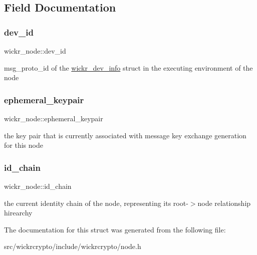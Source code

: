 \subsection{Field Documentation}
\mbox{\label{structwickr__node_a564e42fc1d4b63353d74e5fbf0bead82}} 
\subsubsection{\texorpdfstring{dev\+\_\+id}{dev\_id}}
{\footnotesize\ttfamily wickr\+\_\+node\+::dev\+\_\+id}

msg\+\_\+proto\+\_\+id of the \textquotesingle{}\mbox{\hyperlink{structwickr__dev__info}{wickr\+\_\+dev\+\_\+info}}\textquotesingle{} struct in the executing environment of the node \mbox{\label{structwickr__node_a628b61eed5cb17b831ff687143393b93}} 
\subsubsection{\texorpdfstring{ephemeral\+\_\+keypair}{ephemeral\_keypair}}
{\footnotesize\ttfamily wickr\+\_\+node\+::ephemeral\+\_\+keypair}

the key pair that is currently associated with message key exchange generation for this node \mbox{\label{structwickr__node_a3a5100ed26ae534e2070623713aacfde}} 
\subsubsection{\texorpdfstring{id\+\_\+chain}{id\_chain}}
{\footnotesize\ttfamily wickr\+\_\+node\+::id\+\_\+chain}

the current identity chain of the node, representing its root-\/$>$node relationship hirearchy 

The documentation for this struct was generated from the following file\+:\begin{DoxyCompactItemize}
\item 
src/wickrcrypto/include/wickrcrypto/node.\+h\end{DoxyCompactItemize}
